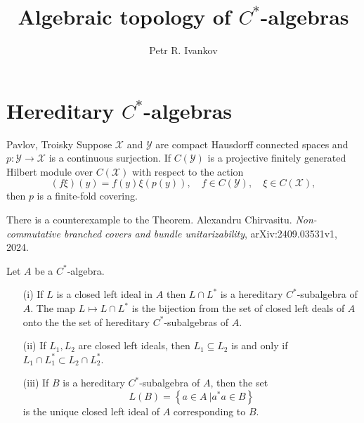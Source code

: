 \documentclass{beamer}
\title{Algebraic topology of $C^*$-algebras}
\institute
{
Algebras in analysis
}
\author{Petr R. Ivankov  }
\theoremstyle{plain}
\begin{document}
\begin{frame}
  \titlepage
\end{frame}
\section{Hereditary $C^*$-algebras}

\begin{frame}
\begin{theorem}\alert{Pavlov, Troisky}
	Suppose $\mathcal X$ and $\mathcal Y$ are compact Hausdorff connected spaces and $p :\mathcal  Y \to \mathcal X$
	is a continuous surjection. If $C(\mathcal Y )$ is a projective finitely generated Hilbert module over
	$C(\mathcal X)$ with respect to the action
	\begin{equation*}
		(f\xi)(y) = f(y)\xi(p(y)),\quad  f \in  C(\mathcal Y ), \quad  \xi \in  C(\mathcal X),
	\end{equation*}
	then $p$ is a finite-fold  covering.
\end{theorem}
	There is a counterexample  to the Theorem. Alexandru Chirvasitu. {\it Non-commutative branched covers and bundle unitarizability}, arXiv:2409.03531v1, 2024.
	

\end{frame}
\begin{frame}
	\begin{lemma}\label{hered_ideal_lem}
	Let $A$ be a $C^*$-algebra.
	\begin{enumerate}
		\item[(i)] If $L$ is a closed left ideal in $A$ then $L\cap L^*$ is a hereditary $C^*$-subalgebra of $A$. The map $L \mapsto L\cap L^*$ is the bijection from the set of closed left deals of $A$ onto the the set of hereditary $C^*$-subalgebras of $A$.
		\item[(ii)] If $L_1, L_2$ are closed left ideals, then $L_1 \subseteq L_2$ is and only if $L_1\cap L_1^* \subset L_2\cap L_2^*$.
		\item[(iii)] If $B$ is a hereditary $C^*$-subalgebra of $A$, then the set 
		$$
		L\left(B \right) = \left\{\left.a \in A~\right| a^*a \in B \right\}
		$$
		is the unique closed left ideal of $A$ corresponding to $B$.
	\end{enumerate}
\end{lemma}

\end{frame}
\end{document}
